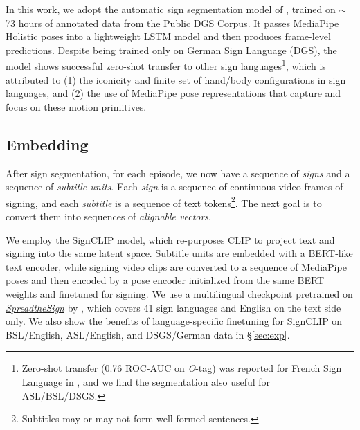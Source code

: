 \documentclass[11pt]{article}
\begin{document}
In this work, we adopt the automatic sign segmentation model of \citet{moryossef-etal-2023-linguistically}, trained on $\sim$73 hours of annotated data from the Public DGS Corpus. 
It passes MediaPipe Holistic \cite{mediapipe2020holistic} poses into a lightweight LSTM \cite{hochreiter1997long} model and then produces frame-level predictions.
Despite being trained only on German Sign Language (DGS), the model shows successful zero-shot transfer to other sign languages\footnote{Zero-shot transfer (0.76 ROC-AUC on \textit{O}-tag) was reported for French Sign Language in \citet{moryossef-etal-2023-linguistically}, and we find the segmentation also useful for ASL/BSL/DSGS.}, which is attributed to (1) the iconicity and finite set of hand/body configurations in sign languages, and (2) the use of MediaPipe pose representations that capture and focus on these motion primitives. 



\subsection{Embedding}
\label{sec:embedding}

After sign segmentation, for each episode, we now have a sequence of \textit{signs} and a sequence of \textit{subtitle units}.
Each \textit{sign} is a sequence of continuous video frames of signing, and each \textit{subtitle} is a sequence of text tokens\footnote{Subtitles may or may not form well-formed sentences.}.
The next goal is to convert them into sequences of \textit{alignable vectors}. %

We employ the SignCLIP \cite{jiang-etal-2024-signclip} model, which re-purposes CLIP \cite{radford2021learning} to
project text and signing into the same latent space.
Subtitle units are embedded with a BERT-like text encoder, while signing video clips are converted to a sequence of MediaPipe poses and then encoded by a pose encoder initialized from the same BERT weights and finetuned for signing. 
We use a multilingual checkpoint pretrained on \textit{\href{https://www.spreadthesign.com/}{SpreadtheSign}} by \citet{jiang-etal-2024-signclip}, which covers 41 sign languages and English on the text side only.
We also show the benefits of language-specific finetuning for SignCLIP on BSL/English, ASL/English, and DSGS/German data in \S\ref{sec:exp}.
\end{document}
